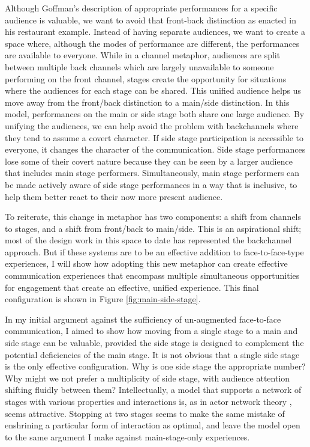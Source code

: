 Although Goffman's description of appropriate performances for a specific audience is valuable, we want to avoid that front-back distinction as enacted in his restaurant example. Instead of having separate audiences, we want to create a space where, although the modes of performance are different, the performances are available to everyone. While in a channel metaphor, audiences are split between multiple back channels which are largely unavailable to someone performing on the front channel, stages create the opportunity for situations where the audiences for each stage can be shared. This unified audience helps us move away from the front/back distinction to a main/side distinction. In this model, performances on the main or side stage both share one large audience. By unifying the audiences, we can help avoid the problem with backchannels where they tend to assume a covert character. If side stage participation is accessible to everyone, it changes the character of the communication. Side stage performances lose some of their covert nature because they can be seen by a larger audience that includes main stage performers. Simultaneously, main stage performers can be made actively aware of side stage performances in a way that is inclusive, to help them better react to their now more present audience.

To reiterate, this change in metaphor has two components: a shift from channels to stages, and a shift from front/back to main/side. This is an aspirational shift; most of the design work in this space to date has represented the backchannel approach. But if these systems are to be an effective addition to face-to-face-type experiences, I will show how adopting this new metaphor can create effective communication experiences that encompass multiple simultaneous opportunities for engagement that create an effective, unified experience. This final configuration is shown in Figure \ref{fig:main-side-stage}. 


In my initial argument against the sufficiency of un-augmented face-to-face communication, I aimed to show how moving from a single stage to a main and side stage can be valuable, provided the side stage is designed to complement the potential deficiencies of the main stage. It is not obvious that a single side stage is the only effective configuration. Why is one side stage the appropriate number? Why might we not prefer a multiplicity of side stage, with audience attention shifting fluidly between them? Intellectually, a model that supports a network of stages with various properties and interactions is, as in actor network theory \citep{latour_reassembling_2007}, seems attractive. Stopping at two stages seems to make the same mistake of enshrining a particular form of interaction as optimal, and leave the model open to the same argument I make against main-stage-only experiences.

